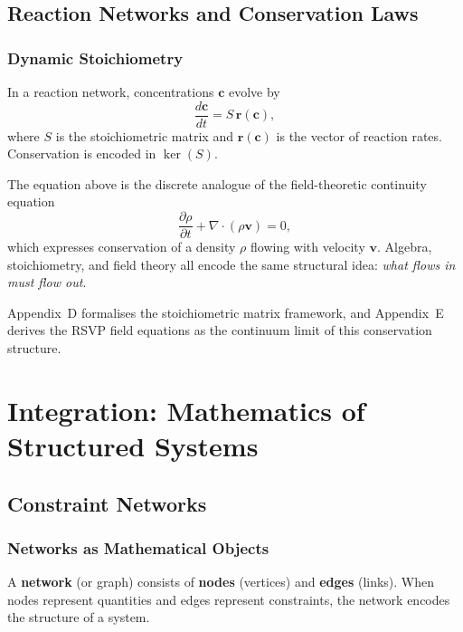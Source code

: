 \documentclass[11pt, openany]{book}
\theoremstyle{plain}
\theoremstyle{definition}
\theoremstyle{remark}
\newcommand{\pd}[2]{\frac{\partial #1}{\partial #2}}
\begin{document}
\chapter{Reaction Networks and Conservation Laws}

\section{Dynamic Stoichiometry}

In a reaction network, concentrations $\mathbf{c}$ evolve by
\[
  \frac{d\mathbf{c}}{dt} = S\,\mathbf{r}(\mathbf{c}),
\]
where $S$ is the stoichiometric matrix and $\mathbf{r}(\mathbf{c})$ is the
vector of reaction rates. Conservation is encoded in $\ker(S)$.

\begin{myexample}
The equation above is the discrete analogue of the field-theoretic continuity
equation
\[
  \pd{\rho}{t} + \nabla\cdot(\rho\mathbf{v}) = 0,
\]
which expresses conservation of a density $\rho$ flowing with velocity
$\mathbf{v}$. Algebra, stoichiometry, and field theory all encode the same
structural idea: \emph{what flows in must flow out}.
\end{myexample}

\begin{deepnote}
Appendix~D formalises the stoichiometric matrix framework, and Appendix~E
derives the RSVP field equations as the continuum limit of this conservation
structure.
\end{deepnote}

\part{Integration: Mathematics of Structured Systems}

\chapter{Constraint Networks}

\section{Networks as Mathematical Objects}

A \textbf{network} (or graph) consists of \textbf{nodes} (vertices) and
\textbf{edges} (links). When nodes represent quantities and edges represent
constraints, the network encodes the structure of a system.
\end{document}
